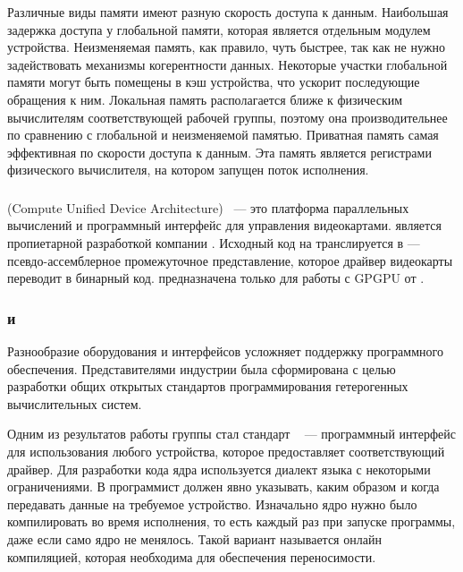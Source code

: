 Различные виды памяти имеют разную скорость доступа к данным.
Наибольшая задержка доступа у глобальной памяти, которая является отдельным модулем устройства.
Неизменяемая память, как правило, чуть быстрее, так как не нужно задействовать
механизмы когерентности данных.
Некоторые участки глобальной памяти могут быть помещены в кэш устройства, что ускорит последующие обращения к ним.
Локальная память располагается ближе к физическим вычислителям соответствующей 
рабочей группы, поэтому она производительнее по сравнению с глобальной и 
неизменяемой памятью.
Приватная память самая эффективная по скорости доступа к данным.
Эта память является регистрами физического вычислителя, на котором запущен 
поток исполнения.

\subsubsection{}
 (Compute Unified Device Architecture)~\cite{CUDA} --- 
это платформа параллельных вычислений и программный интерфейс 
для управления видеокартами.
 является пропиетарной разработкой компании .
Исходный код на  транслируется в  ---
псевдо-ас\-сем\-блер\-ное промежуточное представление, 
которое драйвер видеокарты переводит в бинарный код.
 предназначена только для работы с GPGPU от .

\subsubsection{ и }
Разнообразие оборудования и интерфейсов усложняет поддержку
программного обеспечения.
Представителями индустрии была сформирована  с целью
разработки общих открытых стандартов программирования гетерогенных
вычислительных систем.

Одним из результатов работы группы стал стандарт 
~\cite{OpenCL} --- программный интерфейс для использования любого
устройства, которое предоставляет соответствующий драйвер.
Для разработки кода ядра используется диалект
языка  с некоторыми ограничениями.
В  программист должен явно указывать, каким образом и когда
передавать данные на требуемое устройство.
Изначально ядро нужно было компилировать во время исполнения, 
то есть каждый раз при запуске программы, даже если само ядро не менялось.
Такой вариант называется онлайн компиляцией, которая необходима для 
обеспечения переносимости.

